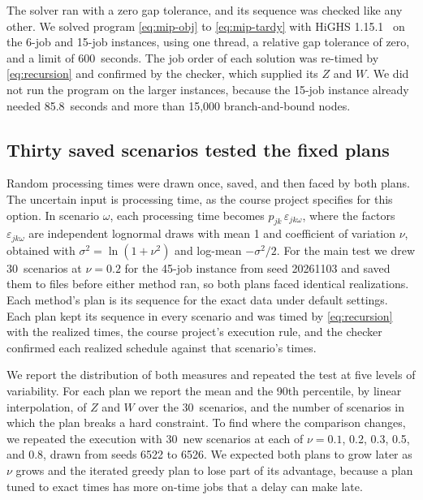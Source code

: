 \sumpara The solver ran with a zero gap tolerance, and its sequence was checked like any other. \sumparaend
\fin We solved program \eqref{eq:mip-obj} to \eqref{eq:mip-tardy} with HiGHS 1.15.1~\cite{highs} on the 6-job and 15-job instances, using one thread, a relative gap tolerance of zero, and a limit of 600~seconds. \fine
\fin The job order of each solution was re-timed by \eqref{eq:recursion} and confirmed by the checker, which supplied its $Z$ and $W$. \fine
\fin We did not run the program on the larger instances, because the 15-job instance already needed 85.8~seconds and more than 15,000 branch-and-bound nodes. \fine

\subsection{Thirty saved scenarios tested the fixed plans}\label{sec:stress-design}

\sumpara Random processing times were drawn once, saved, and then faced by both plans. \sumparaend
\fin The uncertain input is processing time, as the course project specifies for this option. \fine
\fin In scenario $\omega$, each processing time becomes $p_{jk}\,\varepsilon_{jk\omega}$, where the factors $\varepsilon_{jk\omega}$ are independent lognormal draws with mean 1 and coefficient of variation $\nu$, obtained with $\sigma^2 = \ln(1 + \nu^2)$ and log-mean $-\sigma^2/2$. \fine
\fin For the main test we drew 30~scenarios at $\nu = 0.2$ for the 45-job instance from seed 20261103 and saved them to files before either method ran, so both plans faced identical realizations. \fine
\fin Each method's plan is its sequence for the exact data under default settings. \fine
\fin Each plan kept its sequence in every scenario and was timed by \eqref{eq:recursion} with the realized times, the course project's execution rule, and the checker confirmed each realized schedule against that scenario's times. \fine

\sumpara We report the distribution of both measures and repeated the test at five levels of variability. \sumparaend
\fin For each plan we report the mean and the 90th percentile, by linear interpolation, of $Z$ and $W$ over the 30~scenarios, and the number of scenarios in which the plan breaks a hard constraint. \fine
\fin To find where the comparison changes, we repeated the execution with 30~new scenarios at each of $\nu = 0.1$, 0.2, 0.3, 0.5, and 0.8, drawn from seeds 6522 to 6526. \fine
\fin We expected both plans to grow later as $\nu$ grows and the iterated greedy plan to lose part of its advantage, because a plan tuned to exact times has more on-time jobs that a delay can make late. \fine
